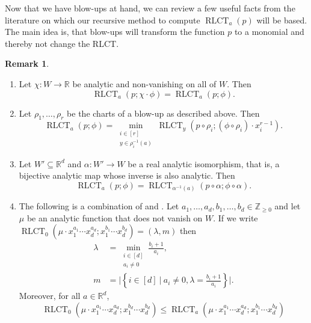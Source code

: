 \documentclass[11pt]{amsart}
\DeclareMathOperator{\rlct}{RLCT}
\numberwithin{equation}{section}
\theoremstyle{plain}
\theoremstyle{definition}
\newtheorem{remark}[theorem]{Remark}
\newcommand{\Z}{\mathbb{Z}}
\newcommand{\R}{\mathbb{R}}
\begin{document}
Now that we have blow-ups at hand, we can review a few useful facts from the literature on which our recursive method to compute $\rlct_a(p)$ will be based. The main idea is, that blow-ups will transform the function $p$ to a monomial and thereby not change the RLCT.

\begin{remark}\label{remark:facts}
    \begin{enumerate}
        \item \cite[Lemma 3.8]{lin:phd} Let $\chi: W \to \R$ be analytic and non-vanishing on all of $W$. Then \[\rlct_a(p;\chi\cdot \phi) = \rlct_a(p;\phi).\]
        \item \cite[Proposition 8]{Lin2017Ideal} Let $\rho_1,\ldots,\rho_r$ be the charts of a blow-up as described above. Then
        \[
        \rlct_a(p;\phi) = \min_{\substack{i \in [r] \\ y \in \rho_i^{-1}(a)}} \rlct_y(p \circ \rho_i; (\phi \circ \rho_i)\cdot x_i^{r-1}).
        \]
        \item \cite[Proposition 8]{Lin2017Ideal} Let $W' \subseteq \R^d$ and $\alpha: W' \to W$ be a real analytic isomorphism, that is, a bijective analytic map whose inverse is also analytic. Then
        \[
        \rlct_a(p;\phi) = \rlct_{\alpha^{-1}(a)}(p\circ \alpha; \phi \circ \alpha).
        \]
        \item The following is a combination of \cite[Theorem 7.1]{Lin:tubes} and \cite[Proposition~6]{Lin2017Ideal}. Let $a_1,\ldots,a_d,b_1,\ldots,b_d \in \Z_{\geq 0}$ and let $\mu$ be an analytic function that does not vanish on $W$. If we write
        $
        \rlct_0(\mu \cdot x_1^{a_1} \cdots x_d^{a_d}; x_1^{b_1} \cdots x_d^{b_d}) = (\lambda,m)
        $
        then
         \begin{align*}
             \lambda &= \min_{\substack{i \in [d] \\ a_i \neq 0 }} \frac{b_i +1}{a_i}, \\
             m &= \bigg\vert  \left\{ i \in [d] \ \bigg\vert \ a_i \neq 0,  \lambda = \frac{b_i +1}{a_i} \right\} \bigg\vert.
         \end{align*}
         Moreover, for all $a \in \R^d$, 
        \[
         \rlct_0(\mu \cdot x_1^{a_1} \cdots x_d^{a_d}; x_1^{b_d} \cdots x_d^{b_d}) \leq \rlct_a(\mu \cdot x_1^{a_1} \cdots x_d^{a_d}; x_1^{b_1} \cdots x_d^{b_d})
        \]
    \end{enumerate}
\end{remark}
\end{document}
